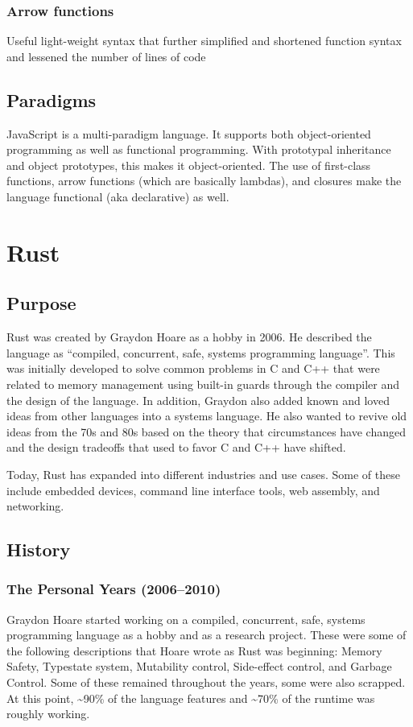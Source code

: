 \documentclass{article}
\begin{document}
  \subsubsection{Arrow functions}
  Useful light-weight syntax that further simplified and shortened function
  syntax and lessened the number of lines of code

  \subsection{Paradigms}
  JavaScript is a multi-paradigm language. It supports both object-oriented
  programming as well as functional programming. With prototypal inheritance and
  object prototypes, this makes it object-oriented. The use of first-class
  functions, arrow functions (which are basically lambdas), and closures make
  the language functional (aka declarative) as well.

  \section{Rust}

  \subsection{Purpose}
  Rust was created by Graydon Hoare as a hobby in 2006. He described the
  language as “compiled, concurrent, safe, systems programming language”. This
  was initially developed to solve common problems in C and C++ that were
  related to memory management using built-in guards through the compiler and
  the design of the language. In addition, Graydon also added known and loved
  ideas from other languages into a systems language. He also wanted to revive
  old ideas from the 70s and 80s based on the theory that circumstances have
  changed and the design tradeoffs that used to favor C and C++ have shifted.

  Today, Rust has expanded into different industries and use cases. Some of
  these include embedded devices, command line interface tools, web assembly,
  and networking.

  \subsection{History}
  \subsubsection{The Personal Years (2006--2010)}
  Graydon Hoare started working on a compiled, concurrent, safe, systems
  programming language as a hobby and as a research project. These were some of
  the following descriptions that Hoare wrote as Rust was beginning: Memory
  Safety, Typestate system, Mutability control, Side-effect control, and Garbage
  Control. Some of these remained throughout the years, some were also scrapped.
  At this point, \textasciitilde90\% of the language features and
  \textasciitilde70\% of the runtime was roughly working.
\end{document}
